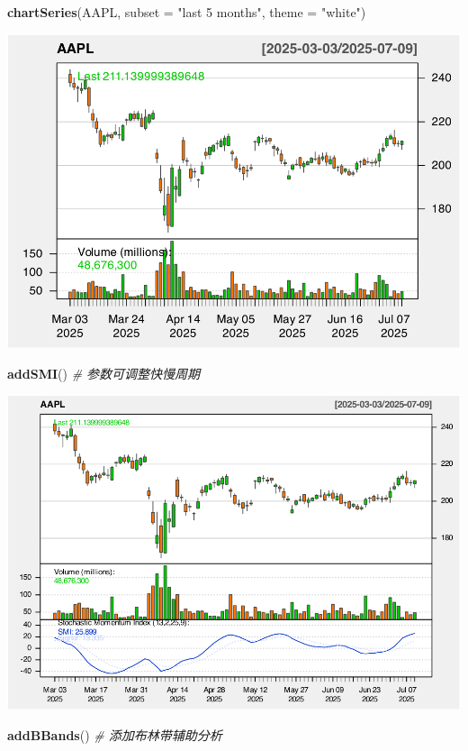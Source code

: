 \documentclass[]{ctexbook}
\newenvironment{Shaded}{\begin{snugshade}}{\end{snugshade}}
\newcommand{\AttributeTok}[1]{\textcolor[rgb]{0.13,0.29,0.53}{#1}}
\newcommand{\CommentTok}[1]{\textcolor[rgb]{0.56,0.35,0.01}{\textit{#1}}}
\newcommand{\FunctionTok}[1]{\textcolor[rgb]{0.13,0.29,0.53}{\textbf{#1}}}
\newcommand{\NormalTok}[1]{#1}
\newcommand{\StringTok}[1]{\textcolor[rgb]{0.31,0.60,0.02}{#1}}
\begin{document}
\begin{Shaded}
\begin{Highlighting}[]
\FunctionTok{chartSeries}\NormalTok{(AAPL, }\AttributeTok{subset =} \StringTok{"last 5 months"}\NormalTok{, }\AttributeTok{theme =} \StringTok{"white"}\NormalTok{)}
\end{Highlighting}
\end{Shaded}

\includegraphics[width=0.9\linewidth]{quantmod_files/figure-latex/smi_2-1}

\begin{Shaded}
\begin{Highlighting}[]
\FunctionTok{addSMI}\NormalTok{()  }\CommentTok{\# 参数可调整快慢周期}
\end{Highlighting}
\end{Shaded}

\includegraphics[width=0.9\linewidth]{quantmod_files/figure-latex/smi_2-2}

\begin{Shaded}
\begin{Highlighting}[]
\FunctionTok{addBBands}\NormalTok{()  }\CommentTok{\# 添加布林带辅助分析}
\end{Highlighting}
\end{Shaded}
\end{document}
